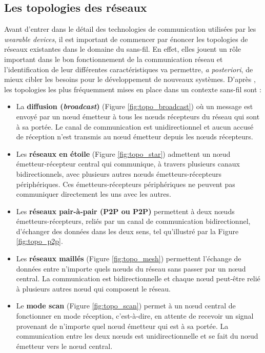 \subsection{Les topologies des réseaux}
\label{sec:topo}

Avant d'entrer dans le détail des technologies de communication utilisées par les \textit{wearable devices}, il est important de commencer par énoncer les topologies de réseaux existantes dans le domaine du sans-fil. En effet, elles jouent un rôle important dans le bon fonctionnement de la communication réseau et l'identification de leur différentes caractéristiques va permettre, \textit{a posteriori}, de mieux cibler les besoins pour le développement de nouveaux systèmes. D'après \cite{Tanenbaum2011}, les topologies les plus fréquemment mises en place dans un contexte sans-fil sont :

\begin{itemize}[label=\textbullet]
	\item
	      La \textbf{diffusion (\textit{broadcast})} (Figure \ref{fig:topo_broadcast}) où un message est envoyé par un n\oe{}ud émetteur à tous les n\oe{}uds récepteurs du réseau qui sont à sa portée. Le canal de communication est unidirectionnel et aucun accusé de réception n'est transmis au n\oe{}ud émetteur depuis les n\oe{}uds récepteurs.
	\item
          Les \textbf{réseaux en étoile} (Figure \ref{fig:topo_star}) admettent un n\oe{}ud émetteur-récepteur central qui communique, à travers plusieurs canaux bidirectionnels, avec plusieurs autres n\oe{}uds émetteurs-récepteurs périphériques. Ces émetteurs-récepteurs périphériques ne peuvent pas communiquer directement les uns avec les autres.
    \item
        Les \textbf{réseaux pair-à-pair (\acl{P2P} ou \acs{P2P})} permettent à deux n\oe{}uds émet\-teurs-récepteurs, reliés par un canal de communication bidirectionnel, d'échanger des données dans les deux sens, tel qu'illustré par la Figure \ref{fig:topo_p2p}.
    \item
        Les \textbf{réseaux maillés} (Figure \ref{fig:topo_mesh}) permettent l'échange de données entre n'importe quels n\oe{}uds du réseau sans passer par un n\oe{}ud central. La communication est bidirectionnelle et chaque n\oe{}ud peut-être relié à plusieurs autres n\oe{}ud qui composent le réseau.
    \item
        Le \textbf{mode scan} (Figure \ref{fig:topo_scan}) permet à un n\oe{}ud central de fonctionner en mode réception, c'est-à-dire, en attente de recevoir un signal provenant de n'importe quel n\oe{}ud émetteur qui est à sa portée. La communication entre les deux n\oe{}uds est unidirectionnelle et se fait du n\oe{}ud émetteur vers le n\oe{}ud central.
\end{itemize}

